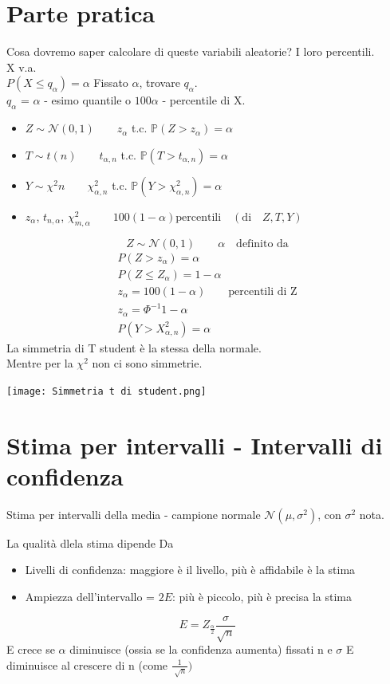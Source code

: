 \documentclass[12pt, a4paper, openany]{book}
\begin{document}
\section{Parte pratica}
Cosa dovremo saper calcolare di queste variabili aleatorie? I loro percentili.
\\ X v.a.
\\ $P(X\leq q_\alpha) = \alpha$ Fissato $\alpha$, trovare $q_\alpha$.
\\ $q_\alpha$ = $\alpha$ - esimo quantile o $100\alpha$ - percentile di X.
\begin{itemize}
    \item $Z \sim \mathcal{N}(0,1) \qquad z_\alpha$ t.c. $\mathbb{P}(Z>z_\alpha) = \alpha$
    \item $T \sim t(n) \qquad t_{\alpha, n}$ t.c. $\mathbb{P}(T>t_{\alpha, n}) = \alpha$
    \item $Y \sim \chi^2{n} \qquad \chi^2_{\alpha, n}$ t.c. $\mathbb{P}(Y>\chi^2_{\alpha,n}) = \alpha$
    \item $z_\alpha$, $t_{n, \alpha}$, $\chi^2_{m, \alpha} 
    \qquad 100(1-\alpha) \text{percentili} \quad (\text{di}\quad Z, T, Y)$
\end{itemize}
\begin{equation*}
    Z \sim \mathcal{N}(0,1) \qquad \alpha \quad \text{definito da}
\end{equation*}
\begin{gather*}
    P(Z>z_\alpha) = \alpha \\
    P(Z\leq Z_\alpha) = 1-\alpha \\
    z_\alpha = 100(1-\alpha) \qquad \text{percentili di Z}\\
    z_\alpha = \Phi^{-1}{1-\alpha} \\
    P(Y > X^2_{\alpha, n}) = \alpha
\end{gather*}
La simmetria di T student è la stessa della normale.
\\ Mentre per la $\chi^2$ non ci sono simmetrie.
\begin{center}
    \texttt{[image: Simmetria t di student.png]}
\end{center}

\section{Stima per intervalli - Intervalli di confidenza}
Stima per intervalli della media - campione normale $\mathcal{N}(\mu, \sigma^2)$, con
$\sigma^2$ nota.

La qualità dlela stima dipende Da
\begin{itemize}
    \item Livelli di confidenza: maggiore è il livello, più è affidabile è la stima
    \item Ampiezza dell'intervallo = $2E$: più è piccolo, più è precisa la stima
\end{itemize}
\begin{equation*}
    E=Z_{\frac{\alpha}{2}}\frac{\sigma}{\sqrt{n}}
\end{equation*}
E crece se $\alpha$ diminuisce (ossia se la confidenza aumenta) fissati n e $\sigma$
E diminuisce al crescere di n (come $\frac{1}{\sqrt[]{n}})$
\end{document}
